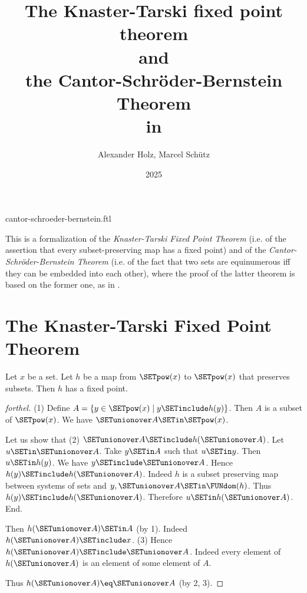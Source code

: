 \documentclass{stex}
\title{The Knaster-Tarski fixed point theorem\\and\\the Cantor-Schröder-Bernstein Theorem\\in \Naproche}
\author{Alexander Holz, Marcel Schütz}
\date{2025}
\begin{document}
\begin{smodule}{cantor-schroeder-bernstein.ftl}
\maketitle


\noindent This is a formalization of the \textit{Knaster-Tarski Fixed Point
Theorem} (i.e. of the assertion that every subset-preserving map has a fixed
point) and of the \textit{Cantor-Schröder-Bernstein Theorem} (i.e. of the
fact that two sets are equinumerous iff they can be embedded into each other),
where the proof of the latter theorem is based on the former one, as in
\cite{Schroeder2012}.

\section*{The Knaster-Tarski Fixed Point Theorem}

\begin{theorem}[forthel,title=Knaster-Tarski,id=knaster_tarski]
  Let $x$ be a set.
  Let $h$ be a map from $\SETpow(x)$ to $\SETpow(x)$ that preserves subsets.
  Then $h$ has a fixed point.
\end{theorem}
\begin{proof}[forthel]
  (1) Define $A = \{y \in \SETpow(x) \mid y \SETinclude h(y)\}$.
  Then $A$ is a subset of $\SETpow(x)$.
  We have $\SETunionover A \SETin \SETpow(x)$.

  Let us show that (2) $\SETunionover A \SETinclude h(\SETunionover A)$.
    Let $u \SETin \SETunionover A$.
    Take $y \SETin A$ such that $u \SETin y$.
    Then $u \SETin h(y)$.
    We have $y \SETinclude \SETunionover A$.
    Hence $h(y) \SETinclude h(\SETunionover A)$.
    Indeed $h$ is a subset preserving map between systems of sets and $y, \SETunionover A \SETin \FUNdom(h)$.
    Thus $h(y) \SETinclude h(\SETunionover A)$.
    Therefore $u \SETin h(\SETunionover A)$.
  End.

  Then $h(\SETunionover A) \SETin A$ (by 1).
  Indeed $h(\SETunionover A) \SETinclude x$.
  (3) Hence $h(\SETunionover A) \SETinclude \SETunionover A$.
  Indeed every element of $h(\SETunionover A)$ is an element of some element of
  $A$.

  Thus $h(\SETunionover A) \eq \SETunionover A$ (by 2, 3).
\end{proof}



\end{smodule}
\end{document}
